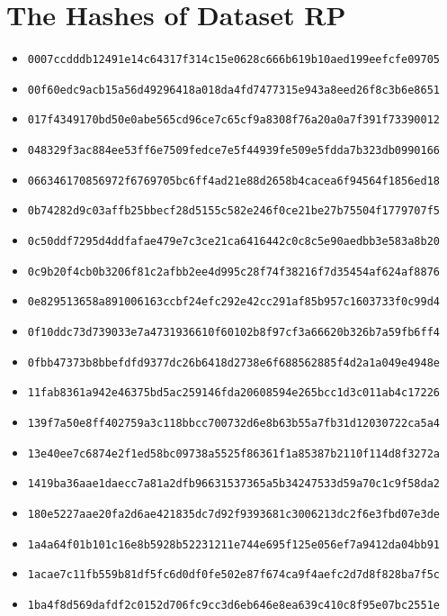 \section{The Hashes of Dataset RP}\label{appendix:hashes dataset rp}
{\footnotesize
\begin{itemize}
    \item \texttt{0007ccdddb12491e14c64317f314c15e0628c666b619b10aed199eefcfe09705}
    \item \texttt{00f60edc9acb15a56d49296418a018da4fd7477315e943a8eed26f8c3b6e8651}
    \item \texttt{017f4349170bd50e0abe565cd96ce7c65cf9a8308f76a20a0a7f391f73390012}
    \item \texttt{048329f3ac884ee53ff6e7509fedce7e5f44939fe509e5fdda7b323db0990166}
    \item \texttt{066346170856972f6769705bc6ff4ad21e88d2658b4cacea6f94564f1856ed18}
    \item \texttt{0b74282d9c03affb25bbecf28d5155c582e246f0ce21be27b75504f1779707f5}
    \item \texttt{0c50ddf7295d4ddfafae479e7c3ce21ca6416442c0c8c5e90aedbb3e583a8b20}
    \item \texttt{0c9b20f4cb0b3206f81c2afbb2ee4d995c28f74f38216f7d35454af624af8876}
    \item \texttt{0e829513658a891006163ccbf24efc292e42cc291af85b957c1603733f0c99d4}
    \item \texttt{0f10ddc73d739033e7a4731936610f60102b8f97cf3a66620b326b7a59fb6ff4}
    \item \texttt{0fbb47373b8bbefdfd9377dc26b6418d2738e6f688562885f4d2a1a049e4948e}
    \item \texttt{11fab8361a942e46375bd5ac259146fda20608594e265bcc1d3c011ab4c17226}
    \item \texttt{139f7a50e8ff402759a3c118bbcc700732d6e8b63b55a7fb31d12030722ca5a4}
    \item \texttt{13e40ee7c6874e2f1ed58bc09738a5525f86361f1a85387b2110f114d8f3272a}
    \item \texttt{1419ba36aae1daecc7a81a2dfb96631537365a5b34247533d59a70c1c9f58da2}
    \item \texttt{180e5227aae20fa2d6ae421835dc7d92f9393681c3006213dc2f6e3fbd07e3de}
    \item \texttt{1a4a64f01b101c16e8b5928b52231211e744e695f125e056ef7a9412da04bb91}
    \item \texttt{1acae7c11fb559b81df5fc6d0df0fe502e87f674ca9f4aefc2d7d8f828ba7f5c}
    \item \texttt{1ba4f8d569dafdf2c0152d706fc9cc3d6eb646e8ea639c410c8f95e07bc2551e}

\end{itemize}}
